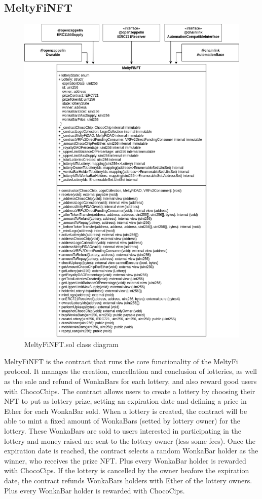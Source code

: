\subsection{MeltyFiNFT}
\begin{figure}
    \centering
    \includegraphics[width=\textwidth]{figures/MeltyFiNFT_class_diagram.png}
    \caption{MeltyFiNFT.sol class diagram}
    \label{fig:MeltyFiNFT}
\end{figure}
MeltyFiNFT is the contract that runs the core functionality of the MeltyFi protocol. It manages the creation, cancellation and conclusion of lotteries, as well as the sale and refund of WonkaBars for each lottery, and also reward good users with ChocoChips. The contract allows users to create a lottery by choosing their NFT to put as lottery prize, setting an expiration date and defining a price in Ether for each WonkaBar sold. When a lottery is created, the contract will be able to mint a fixed amount of WonkaBars (setted by lottery owner) for the lottery. These WonkaBars are sold to users interested in participating in the lottery and money raised are sent to the lottery owner (less some fees). Once the expiration date is reached, the contract selects a random WonkaBar holder as the winner, who receives the prize NFT. Plus every WonkaBar holder is rewarded with ChocoCips. If the lottery is cancelled by the owner beafore the expiration date, the contract refunds WonkaBars holders with Ether of the lottery owners. Plus every WonkaBar holder is rewarded with ChocoCips.
